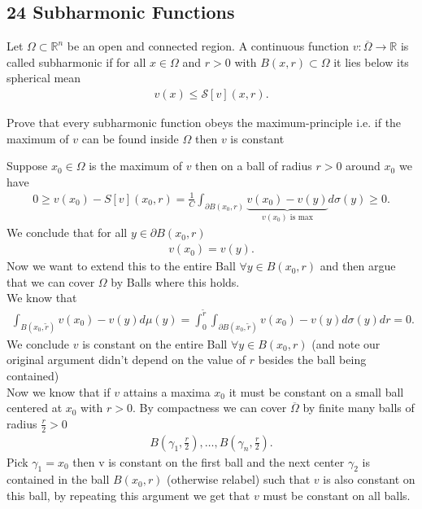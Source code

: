 \subsection*{24 Subharmonic Functions}
Let $\Omega \subset  \mathbb{R}^{n} $ be an open and connected region. A continuous function $v : \overline{\Omega } \to \mathbb{R} $
is called subharmonic if for all $x \in  \Omega $ and $r>0$ with $B(x,r) \subset  \Omega $ it lies below its spherical mean 
\begin{align*}
  v(x) \le  \mathcal{S}[v](x,r)
.\end{align*}
\begin{question}[a]
 Prove that every subharmonic function obeys the maximum-principle i.e. 
 if the maximum of $v$ can be found inside $\Omega $ then $v$ is constant
\end{question}
\begin{solution}
 Suppose $x_{0} \in  \Omega $ is the maximum of $v$ then on a ball of radius $r>0$ around $x_{0}$ we have
 \begin{align*}
   0 \ge  v(x_{0}) - S[v](x_{0},r) = \frac{1}{C} \int_{\partial B(x_{0},r)} \underbrace{v(x_{0}) - v(y)}_{v(x_{0})\text{ is max}} d\sigma(y) \ge  0
 .\end{align*}
 We conclude that for all $y \in  \partial B(x_{0},r)$ 
 \begin{align*}
  v(x_{0}) = v(y)
 .\end{align*}
 Now we want to extend this to the entire Ball $\forall y \in  B(x_{0},r)$ and then argue that we can cover 
 $\Omega $ by Balls where this holds.\\[1ex]
 We know that
 \begin{align*}
   \int_{B(x_{0},\tilde{r} )} v(x_{0})-v(y) d\mu(y) = \int_0^{\tilde{r}} \int_{\partial B(x_{0},\tilde{r} )} v(x_{0})-v(y) d\sigma(y) dr  = 0
 .\end{align*}
 We conclude $v$ is constant on the entire Ball $\forall y \in  B(x_{0},r)$ (and note our original argument didn't depend on the value of $r$ besides the ball being contained)\\[1ex]
 Now we know that if $v$ attains a maxima $x_{0}$ it must be constant on a small ball centered at $x_{0}$ with $r>0$. 
 By compactness we can cover $\overline{\Omega }$  by finite many balls of radius $\frac{r}{2}>0$ 
 \begin{align*}
  B(\gamma_{1},\frac{r}{2}),\ldots ,B(\gamma_n,\frac{r}{2})
 .\end{align*}
 Pick $\gamma_{1} = x_{0}$ then v is constant on the first ball and the next center $\gamma_{2}$ is contained in the ball 
 $B(x_{0},r)$ (otherwise relabel) such that $v$ is also constant on this ball, by repeating this argument we get that $v$ must be constant on all balls.
\end{solution}
